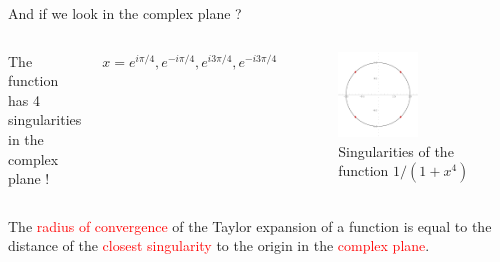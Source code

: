 \documentclass[xcolor=x11names,compress]{beamer}
\renewcommand{\(}{\begin{columns}}
\renewcommand{\)}{\end{columns}}
\newcommand{\<}[1]{\begin{column}{#1}}
\renewcommand{\>}{\end{column}}
\begin{document}
\begin{frame}{And if we look in the complex plane ?}

\begin{columns}


\centering The function has 4 singularities in the complex plane !

\vspace{1cm}

$x = e^{i\pi/4}, e^{-i\pi/4}, e^{i3\pi/4}, e^{-i3\pi/4}$


\begin{figure}
    \centering
    \includegraphics[width=0.6\textwidth]{possingu.pdf}
    \caption{\centering Singularities of the function $1/(1+x^4)$}
    \label{fig:my_label}
\end{figure}

\end{columns}

The \textcolor{red}{radius of convergence} of the Taylor expansion of a function is equal to the distance of the \textcolor{red}{closest singularity} to the origin in the \textcolor{red}{complex plane}.
    
\end{frame}
\end{document}

